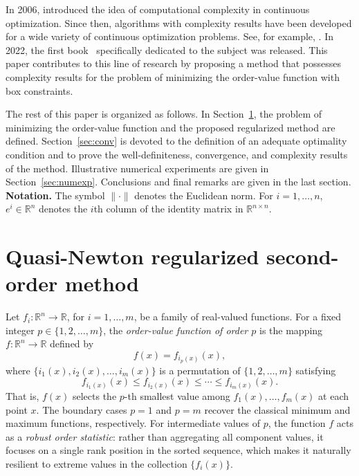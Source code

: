 \documentclass[11pt]{article}
\newcommand{\R}{\mathbb{R}}
\begin{document}
In 2006, \cite{nesterov} introduced the idea of computational complexity in continuous optimization. Since then, algorithms with complexity results have been developed for a wide variety of continuous optimization problems. See, for example, \cite{bgmst2,bgmst1}. In 2022, the first book~\cite{cogtbook} specifically dedicated to the subject was released. This paper contributes to this line of research by proposing a method that possesses complexity results for the problem of minimizing the order-value function with box constraints.

The rest of this paper is organized as follows. In Section~\ref{sec:method}, the problem of minimizing the order-value function and the proposed regularized method are defined. Section~\ref{sec:conv} is devoted to the definition of an adequate optimality condition and to prove the well-definiteness, convergence, and complexity results of the method. Illustrative numerical experiments are given in Section~\ref{sec:numexp}. Conclusions and final remarks are given in the last section.\\

\noindent
\textbf{Notation.} The symbol $\| \cdot \|$ denotes the Euclidean norm. For $i=1,\dots,n$, $e^i \in \R^n$ denotes the $i$th column of the identity matrix in $\R^{n \times n}$.

\section{Quasi-Newton regularized second-order method} \label{sec:method}

Let $f_i : \mathbb{R}^n \to \mathbb{R}$, for $i = 1, \ldots, m$, be a 
family of real-valued functions. For a fixed integer $p \in \{1, 2, 
\ldots, m\}$, the \textit{order-value function of order $p$} is the 
mapping $f : \mathbb{R}^n \to \mathbb{R}$ defined by
\begin{equation}
    f(x) = f_{i_p(x)}(x), \label{ovo-function}
\end{equation}
where $\{i_1(x), i_2(x), \ldots, i_m(x)\}$ is a permutation of 
$\{1, 2, \ldots, m\}$ satisfying
\begin{equation}
    f_{i_1(x)}(x) \leq f_{i_2(x)}(x) \leq \cdots \leq f_{i_m(x)}(x).
    \label{fi-sort}
\end{equation}
That is, $f(x)$ selects the $p$-th smallest value among 
$f_1(x), \ldots, f_m(x)$ at each point $x$. The boundary cases 
$p = 1$ and $p = m$ recover the classical minimum and maximum 
functions, respectively. For intermediate values of $p$, the function 
$f$ acts as a \textit{robust order statistic}: rather than aggregating 
all component values, it focuses on a single rank position in the 
sorted sequence, which makes it naturally resilient to extreme values 
in the collection $\{f_i(x)\}$.
\end{document}
